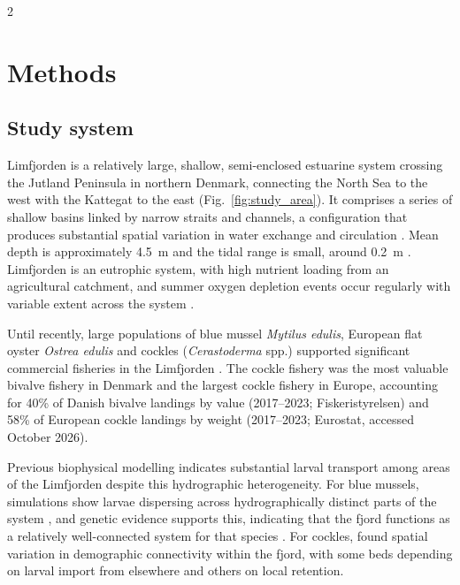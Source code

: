 \begin{spacing}{2}
\section{Methods}

\subsection{Study system}

Limfjorden is a relatively large, shallow, semi-enclosed estuarine system crossing the Jutland Peninsula in northern Denmark, connecting the North Sea to the west with the Kattegat to the east (Fig.~\ref{fig:study_area}). It comprises a series of shallow basins linked by narrow straits and channels, a configuration that produces substantial spatial variation in water exchange and circulation \citep{hofmeisterThreedimensionalModelStudy2009}. Mean depth is approximately 4.5~m and the tidal range is small, around 0.2~m \citep{wilesStratificationMixingLimfjorden2006, dolmerEvaluationDanishMussel2002}. Limfjorden is an eutrophic system, with high nutrient loading from an agricultural catchment, and summer oxygen depletion events occur regularly with variable extent across the system \citep{schourup-kristensenDriversHypoxiaVariability2023}. 

Until recently, large populations of blue mussel \textit{Mytilus edulis}, European flat oyster \textit{Ostrea edulis} and cockles (\textit{Cerastoderma} spp.) supported significant commercial fisheries in the Limfjorden \citep[e.g.][]{nielsenFlatOysterFishery2019, nielsenManagementBivalveFisheries2021,
Freitas2024}. The cockle fishery was the most valuable bivalve
fishery in Denmark and the largest cockle fishery in Europe, accounting for 40\% of Danish bivalve landings by value (2017--2023; Fiskeristyrelsen) and 58\% of European cockle landings by weight (2017--2023; Eurostat, accessed October 2026).

Previous biophysical modelling indicates substantial larval transport among areas of the Limfjorden despite this hydrographic heterogeneity. For blue mussels, simulations show larvae dispersing across hydrographically distinct parts of the system \citep{pastorAgentbasedModelingGenetics2021, pastorSensitivityAnalysisMussel2023}, and genetic evidence supports this, indicating that the fjord functions as a relatively well-connected system for that species \citep{pastorAgentbasedModelingGenetics2021}. For cockles, \citet{hansenAssessingDemographicConnectivity2024} found spatial variation in demographic connectivity within the fjord, with some beds depending on larval import from elsewhere and others on local retention.


\end{spacing}
